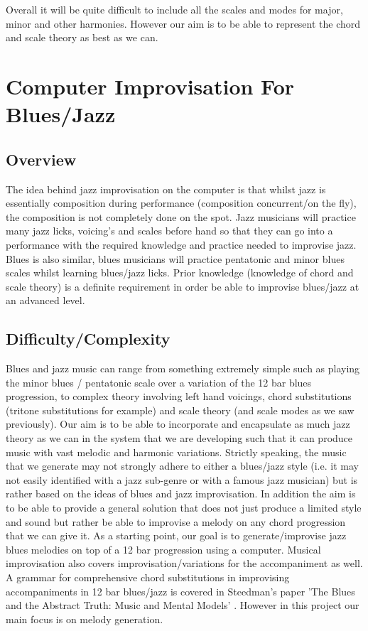 \documentclass[pdftex,12pt,a4paper]{report}
\begin{document}
Overall it will be quite difficult to include all the scales and modes for major, minor and other harmonies. However our aim is to be able to represent the chord and scale theory as best as we can.

\section{Computer Improvisation For Blues/Jazz}

\subsection{Overview}
The idea behind jazz improvisation on the computer is that whilst jazz is essentially composition during performance (composition concurrent/on the fly), the composition is not completely done on the spot. Jazz musicians will practice many jazz licks, voicing's and scales before hand so that they can go into a performance with the required knowledge and practice needed to improvise jazz. Blues is also similar, blues musicians will practice pentatonic and minor blues scales whilst learning blues/jazz licks. Prior knowledge (knowledge of chord and scale theory) is a definite requirement in order be able to improvise blues/jazz at an advanced level.

\subsection{Difficulty/Complexity}
Blues and jazz music can range from something extremely simple such as playing the minor blues / pentatonic scale over a variation of the 12 bar blues progression, to complex theory involving left hand voicings, chord substitutions (tritone substitutions for example) and scale theory (and scale modes as we saw previously). Our aim is to be able to incorporate and encapsulate as much jazz theory as we can in the system that we are developing such that it can produce music with vast melodic and harmonic variations. Strictly speaking, the music that we generate may not strongly adhere to either a blues/jazz style (i.e. it may not easily identified with a jazz sub-genre or with a famous jazz musician) but is rather based on the ideas of blues and jazz improvisation. In addition the aim is to be able to provide a general solution that does not just produce a limited style and sound but rather be able to improvise a melody on any chord progression that we can give it. As a starting point, our goal is to generate/improvise jazz blues melodies on top of a 12 bar progression using a computer. Musical improvisation also covers improvisation/variations for the accompaniment as well. A grammar for comprehensive chord substitutions in improvising accompaniments in 12 bar blues/jazz is covered in Steedman's paper 'The Blues and the Abstract Truth: Music and Mental Models' \cite{steedman96}. However in this project our main focus is on melody generation.
\end{document}
